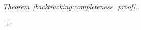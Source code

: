 \begin{proof}[Theorem~\ref{backtracking:completeness_proof}]
\begin{enumerate}
\end{enumerate}
\end{proof}
